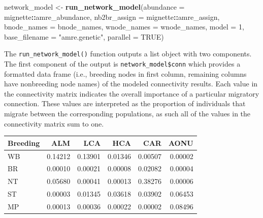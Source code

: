 \documentclass[
]{book}
\newenvironment{Shaded}{\begin{snugshade}}{\end{snugshade}}
\newcommand{\AttributeTok}[1]{\textcolor[rgb]{0.13,0.29,0.53}{#1}}
\newcommand{\ConstantTok}[1]{\textcolor[rgb]{0.56,0.35,0.01}{#1}}
\newcommand{\DecValTok}[1]{\textcolor[rgb]{0.00,0.00,0.81}{#1}}
\newcommand{\FunctionTok}[1]{\textcolor[rgb]{0.13,0.29,0.53}{\textbf{#1}}}
\newcommand{\NormalTok}[1]{#1}
\newcommand{\OtherTok}[1]{\textcolor[rgb]{0.56,0.35,0.01}{#1}}
\newcommand{\SpecialCharTok}[1]{\textcolor[rgb]{0.81,0.36,0.00}{\textbf{#1}}}
\newcommand{\StringTok}[1]{\textcolor[rgb]{0.31,0.60,0.02}{#1}}
\begin{document}
\begin{Shaded}
\begin{Highlighting}[]
\NormalTok{network\_model }\OtherTok{\textless{}{-}} \FunctionTok{run\_network\_model}\NormalTok{(}\AttributeTok{abundance =}\NormalTok{ mignette}\SpecialCharTok{::}\NormalTok{amre\_abundance,}
                        \AttributeTok{nb2br\_assign =}\NormalTok{ mignette}\SpecialCharTok{::}\NormalTok{amre\_assign,}
                        \AttributeTok{bnode\_names =}\NormalTok{ bnode\_names,}
                        \AttributeTok{wnode\_names =}\NormalTok{ wnode\_names,}
                        \AttributeTok{model =} \DecValTok{1}\NormalTok{, }
                        \AttributeTok{base\_filename =} \StringTok{"amre.genetic"}\NormalTok{,}
                        \AttributeTok{parallel =} \ConstantTok{TRUE}\NormalTok{)}
\end{Highlighting}
\end{Shaded}

The \texttt{run\_network\_model()} function outputs a list object with two components. The first component of the output is \texttt{network\_model\$conn} which provides a formatted data frame (i.e., breeding nodes in first column, remaining columns have nonbreeding node names) of the modeled connectivity results. Each value in the connectivity matrix indicates the overall importance of a particular migratory connection. These values are interpreted as the proportion of individuals that migrate between the corresponding populations, as such all of the values in the connectivity matrix sum to one.

\begin{Shaded}
\end{Shaded}

\begin{tabular}{l|r|r|r|r|r}
\hline
Breeding & ALM & LCA & HCA & CAR & AONU\\
\hline
WB & 0.14212 & 0.13901 & 0.01346 & 0.00507 & 0.00002\\
\hline
BR & 0.00010 & 0.00021 & 0.00008 & 0.02082 & 0.00004\\
\hline
NT & 0.05680 & 0.00041 & 0.00013 & 0.38276 & 0.00006\\
\hline
ST & 0.00003 & 0.01345 & 0.03618 & 0.03902 & 0.06453\\
\hline
MP & 0.00013 & 0.00036 & 0.00022 & 0.00002 & 0.08496\\
\hline
\end{tabular}
\end{document}
